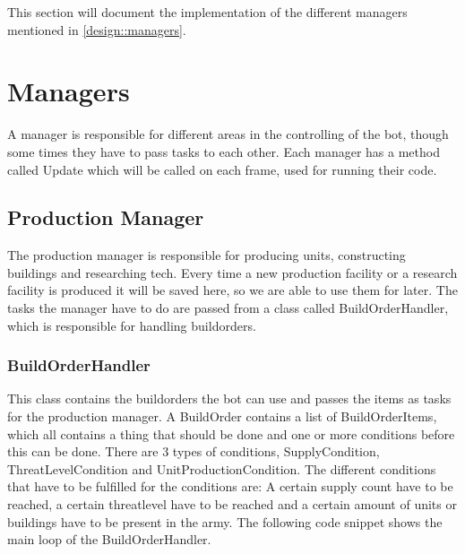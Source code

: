 This section will document the implementation of the different managers mentioned in \ref{design::managers}. 

\section{Managers}
	A manager is responsible for different areas in the controlling of the bot, though some times they have to pass tasks to each other. Each manager has 
	a method called Update which will be called on each frame, used for running their code.
	\subsection{Production Manager}
		The production manager is responsible for producing units, constructing buildings and researching tech. Every time a new production facility or 
		a research facility is produced it will be saved here, so we are able to use them for later. The tasks the manager have to do are passed from a 
		class called BuildOrderHandler, which is responsible for handling buildorders.
		\subsubsection*{BuildOrderHandler}
			This class contains the buildorders the bot can use and passes the items as tasks for the production manager. A BuildOrder contains a list of 
			BuildOrderItems, which all contains a thing that should be done and one or more conditions before this can be done. 
			There are 3 types of conditions, SupplyCondition, ThreatLevelCondition and UnitProductionCondition. The different conditions that have 
			to be fulfilled for the conditions are: A certain supply count have to be reached, a certain threatlevel have to be reached and a certain 
			amount of units or buildings have to be present in the army. The following code snippet shows the main loop of the BuildOrderHandler. 
			

